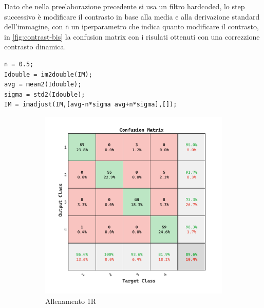 Dato che nella preelaborazione precedente si usa un filtro hardcoded, lo step successivo è modificare il  contrasto in base alla media e alla derivazione standard dell'immagine, con \lstinline{n} un iperparametro che indica quanto modificare il contrasto, in \cref{fig:contrast-bis}  la confusion matrix con i risulati ottenuti con una correzzione contrasto dinamica.
\begin{lstlisting}
n = 0.5;  
Idouble = im2double(IM); 
avg = mean2(Idouble);
sigma = std2(Idouble);
IM = imadjust(IM,[avg-n*sigma avg+n*sigma],[]);
\end{lstlisting}

\begin{figure}[ht]
    \centering
    \begin{subfigure}{0.45\textwidth}
        \includegraphics[width=\textwidth]{addestramento-rete-neurale/one-contrast-bis.pdf}
        \caption{Allenamento 1R} 
    \end{subfigure}
    \begin{subfigure}{0.45\textwidth}

\end{subfigure}
\end{figure}
